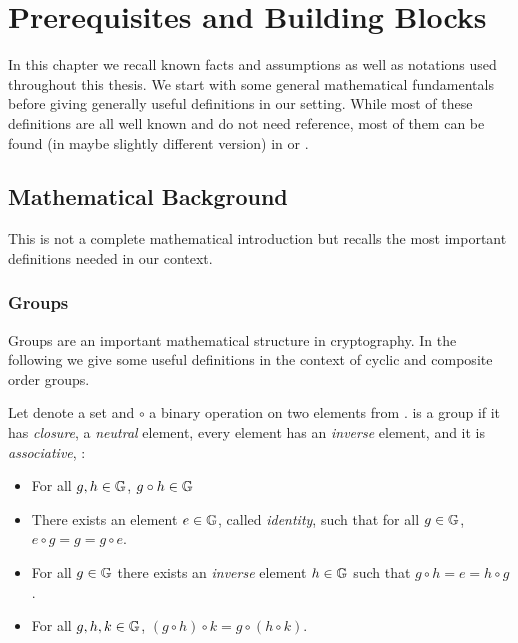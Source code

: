 
\chapter{Prerequisites and Building Blocks}\label{ch:prelims}


In this chapter we recall known facts and assumptions as well as notations used throughout this thesis.
We start with some general mathematical fundamentals before giving generally useful definitions in our setting.
While most of these definitions are all well known and do not need reference, most of them can be found (in maybe slightly different version) in \citet{katz2008introduction} or \citet{Goldreich2001}.

\section{Mathematical Background}
This is not a complete mathematical introduction but recalls the most important definitions needed in our context.

\subsection{Groups}
Groups are an important mathematical structure in cryptography.
In the following we give some useful definitions in the context of cyclic and composite order groups.

\begin{definition}[Groups]\label{def:groups}
Let \GG denote a set and $\circ$ a binary operation on two elements from \GG.
\GG is a group if it has \emph{closure}, a \emph{neutral} element, every element has an \emph{inverse} element, and it is \emph{associative}, \ie :
\begin{itemize}
	\item For all $g,h\in\mathbb{G}$, $g\circ h \in\mathbb{G}$
	\item There exists an element $e\in\mathbb{G}$, called \emph{identity}, such that for all $g\in\mathbb{G}$, $e\circ g=g=g\circ e$.
	\item For all $g\in\mathbb{G}$ there exists an \emph{inverse} element $h\in\mathbb{G}$ such that $g\circ h=e=h\circ g$.
	\item For all $g,h,k\in\mathbb{G}$, $(g\circ h)\circ k=g\circ (h \circ k)$. \eod
\end{itemize}
\end{definition}

